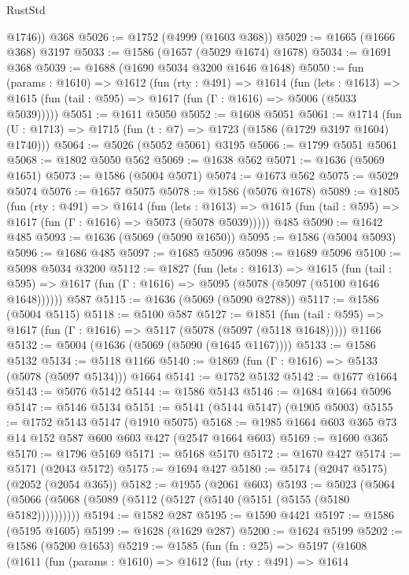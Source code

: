 \begin{lexlean}{RustStd}
\begin{coremodule}
        @1746))
    @368
@5026 := @1752 (@4999 (@1603 @368))
@5029 := @1665 (@1666 @368) @3197
@5033 := @1586 (@1657 (@5029 @1674) @1678)
@5034 := @1691 @368
@5039 := @1688 (@1690 @5034 @3200 @1646 @1648)
@5050 := fun (params : @1610) =>
  @1612
    (fun (rty : @491) =>
    @1614
      (fun (lets : @1613) =>
      @1615 (fun (tail : @595) => @1617 (fun (Γ : @1616) => @5006 (@5033 @5039)))))
@5051 := @1611 @5050
@5052 := @1608 @5051
@5061 := @1714 (fun (U : @1713) => @1715 (fun (t : @7) => @1723 (@1586 (@1729 @3197 @1604) @1740)))
@5064 := @5026 (@5052 @5061) @3195
@5066 := @1799 @5051 @5061
@5068 := @1802 @5050 @562
@5069 := @1638 @562
@5071 := @1636 (@5069 @1651)
@5073 := @1586 (@5004 @5071)
@5074 := @1673 @562
@5075 := @5029 @5074
@5076 := @1657 @5075
@5078 := @1586 (@5076 @1678)
@5089 := @1805
    (fun (rty : @491) =>
    @1614
      (fun (lets : @1613) =>
      @1615 (fun (tail : @595) => @1617 (fun (Γ : @1616) => @5073 (@5078 @5039)))))
    @485
@5090 := @1642 @485
@5093 := @1636 (@5069 (@5090 @1650))
@5095 := @1586 (@5004 @5093)
@5096 := @1686 @485
@5097 := @1685 @5096
@5098 := @1689 @5096
@5100 := @5098 @5034 @3200
@5112 := @1827
    (fun (lets : @1613) =>
    @1615
      (fun (tail : @595) => @1617 (fun (Γ : @1616) => @5095 (@5078 (@5097 (@5100 @1646 @1648))))))
    @587
@5115 := @1636 (@5069 (@5090 @2788))
@5117 := @1586 (@5004 @5115)
@5118 := @5100 @587
@5127 := @1851
    (fun (tail : @595) => @1617 (fun (Γ : @1616) => @5117 (@5078 (@5097 (@5118 @1648)))))
    @1166
@5132 := @5004 (@1636 (@5069 (@5090 (@1645 @1167))))
@5133 := @1586 @5132
@5134 := @5118 @1166
@5140 := @1869 (fun (Γ : @1616) => @5133 (@5078 (@5097 @5134))) @1664
@5141 := @1752 @5132
@5142 := @1677 @1664
@5143 := @5076 @5142
@5144 := @1586 @5143
@5146 := @1684 @1664 @5096
@5147 := @5146 @5134
@5151 := @5141 (@5144 @5147) (@1905 @5003)
@5155 := @1752 @5143 @5147 (@1910 @5075)
@5168 := @1985 @1664 @603 @365 @73 @14 @152 @587 @600 @603 @427 (@2547 @1664 @603)
@5169 := @1600 @365
@5170 := @1796 @5169
@5171 := @5168 @5170
@5172 := @1670 @427
@5174 := @5171 (@2043 @5172)
@5175 := @1694 @427
@5180 := @5174 (@2047 @5175) (@2052 (@2054 @365))
@5182 := @1955 (@2061 @603)
@5193 := @5023 (@5064 (@5066 (@5068 (@5089 (@5112 (@5127 (@5140 (@5151 (@5155 (@5180 @5182))))))))))
@5194 := @1582 @287
@5195 := @1590 @4421
@5197 := @1586 (@5195 @1605)
@5199 := @1628 (@1629 @287)
@5200 := @1624 @5199
@5202 := @1586 (@5200 @1653)
@5219 := @1585
    (fun (fn : @25) =>
    @5197
      (@1608
        (@1611
          (fun (params : @1610) =>
          @1612
            (fun (rty : @491) =>
            @1614

\end{coremodule}
\end{lexlean}
